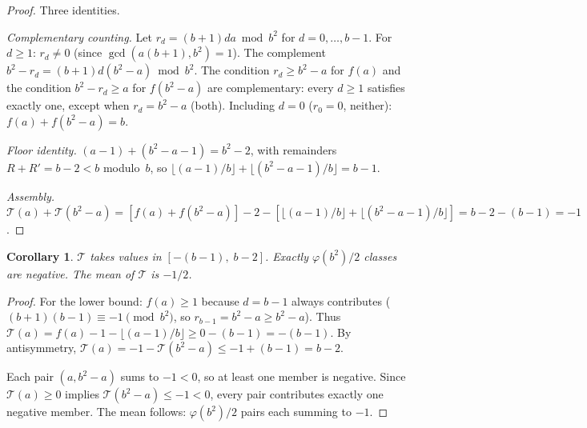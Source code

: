 \documentclass[12pt]{amsart}
\newtheorem{corollary}[theorem]{Corollary}
\theoremstyle{definition}
\theoremstyle{remark}
\begin{document}
\begin{proof}
Three identities.

\emph{Complementary counting.}
Let $r_d = (b{+}1)da \bmod b^2$ for $d = 0, \ldots, b{-}1$.
For $d \ge 1$: $r_d \ne 0$ (since $\gcd(a(b{+}1), b^2) = 1$).
The complement $b^2 - r_d = (b{+}1)d(b^2{-}a) \bmod b^2$.
The condition $r_d \ge b^2 - a$ for $f(a)$ and the condition
$b^2 - r_d \ge a$ for $f(b^2{-}a)$ are complementary: every
$d \ge 1$ satisfies exactly one, except when $r_d = b^2 - a$
(both). Including $d = 0$ ($r_0 = 0$, neither):
$f(a) + f(b^2{-}a) = b$.

\emph{Floor identity.}
$(a{-}1) + (b^2{-}a{-}1) = b^2 - 2$, with remainders
$R + R' = b - 2 < b$ modulo~$b$, so
$\lfloor(a{-}1)/b\rfloor + \lfloor(b^2{-}a{-}1)/b\rfloor
= b - 1$.

\emph{Assembly.}
$\mathcal{T}(a) + \mathcal{T}(b^2{-}a) =
[f(a) + f(b^2{-}a)] - 2 -
[\lfloor(a{-}1)/b\rfloor + \lfloor(b^2{-}a{-}1)/b\rfloor]
= b - 2 - (b{-}1) = -1$.
\end{proof}

\begin{corollary}\label{cor:range}
$\mathcal{T}$ takes values in $[-(b{-}1),\; b{-}2]$.
Exactly $\varphi(b^2)/2$ classes are negative. The mean
of $\mathcal{T}$ is $-1/2$.
\end{corollary}

\begin{proof}
For the lower bound: $f(a) \ge 1$ because $d = b{-}1$
always contributes ($(b{+}1)(b{-}1) \equiv -1 \pmod{b^2}$,
so $r_{b-1} = b^2 - a \ge b^2 - a$). Thus
$\mathcal{T}(a) = f(a) - 1 - \lfloor(a{-}1)/b\rfloor
\ge 0 - (b{-}1) = -(b{-}1)$. By antisymmetry,
$\mathcal{T}(a) = -1 - \mathcal{T}(b^2{-}a)
\le -1 + (b{-}1) = b - 2$.

Each pair $(a, b^2{-}a)$ sums to $-1 < 0$, so at least
one member is negative. Since $\mathcal{T}(a) \ge 0$
implies $\mathcal{T}(b^2{-}a) \le -1 < 0$, every pair
contributes exactly one negative member. The mean follows:
$\varphi(b^2)/2$ pairs each summing to $-1$.
\end{proof}
\end{document}

